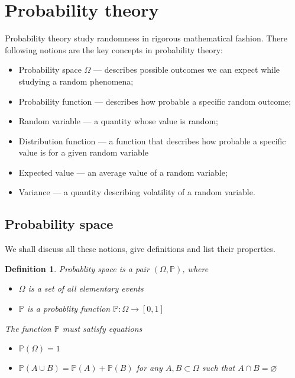\documentclass[12pt]{article}
\newtheorem{definition}[theorem]{Definition}
\begin{document}
\section{Probability theory}

Probability theory study randomness in rigorous mathematical fashion. There following notions are the key concepts in probability theory:
\begin{itemize}
    \item Probability space $\Omega$ --- describes possible outcomes we can expect while studying a random phenomena;
    \item Probability function --- describes how probable a specific random outcome;
    \item Random variable --- a quantity whose value is random;
    \item Distribution function --- a function that describes how probable a specific value is for a given random variable
    \item Expected value --- an average value of a random variable;
    \item Variance --- a quantity describing volatility of a random variable.
\end{itemize}



\subsection{Probability space}

We shall discuss all these notions, give definitions and list their properties.

\begin{definition}
Probablity space is a pair $(\Omega,\mathbb{P})$, where

\begin{itemize}
    \item $\Omega$ is a set of all elementary events
    \item $\mathbb{P}$ is a probablity function $\mathbb{P}:\Omega\to [0,1]$ 
\end{itemize}
The function $\mathbb{P}$ must satisfy equations
\begin{itemize}
    \item $\mathbb{P}(\Omega)=1$
    \item  $\mathbb{P}(A\cup B)=\mathbb{P}(A)+\mathbb{P}(B)$ for any $A,B\subset \Omega$ such that $A\cap B=\varnothing$
\end{itemize}
\end{definition}
\end{document}
